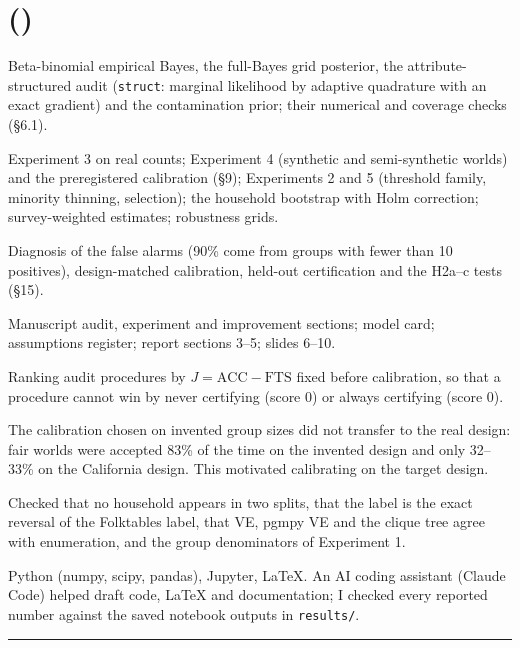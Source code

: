 \documentclass[11pt]{article}
\begin{document}
\section*{\StudentB{} (\RollB)}
\begin{description}[leftmargin=4.2cm,style=nextline]
  \item[Audit models] Beta\nobreakdash-binomial empirical Bayes, the full-Bayes grid posterior, the attribute-structured audit
    (\texttt{struct}: marginal likelihood by adaptive quadrature with an exact gradient) and the contamination prior;
    their numerical and coverage checks (\S6.1).
  \item[Experiments] Experiment 3 on real counts; Experiment 4 (synthetic and semi-synthetic worlds) and the
    preregistered calibration (\S9); Experiments 2 and 5 (threshold family, minority thinning, selection); the household
    bootstrap with Holm correction; survey-weighted estimates; robustness grids.
  \item[Improved procedure] Diagnosis of the false alarms (90\% come from groups with fewer than 10 positives),
    design-matched calibration, held-out certification and the H2a--c tests (\S15).
  \item[Writing] Manuscript audit, experiment and improvement sections; model card; assumptions register; report
    sections 3--5; slides 6--10.
  \item[Technical decision] Ranking audit procedures by $J=\text{ACC}-\text{FTS}$ fixed before calibration, so that a
    procedure cannot win by never certifying (score 0) or always certifying (score 0).
  \item[Difficulty or failure] The calibration chosen on invented group sizes did not transfer to the real design: fair
    worlds were accepted 83\% of the time on the invented design and only 32--33\% on the California design. This
    motivated calibrating on the target design.
  \item[Cross-check of \StudentA's work] Checked that no household appears in two splits, that the label is the exact
    reversal of the Folktables label, that VE, pgmpy VE and the clique tree agree with enumeration, and the group
    denominators of Experiment 1.
  \item[Tools and assistance] Python (numpy, scipy, pandas), Jupyter, LaTeX. An AI coding assistant (Claude Code)
    helped draft code, LaTeX and documentation; I checked every reported number against the saved notebook outputs in
    \nolinkurl{results/}.
  \item[Signature and date] \rule{6cm}{0.4pt}
\end{description}
\end{document}
